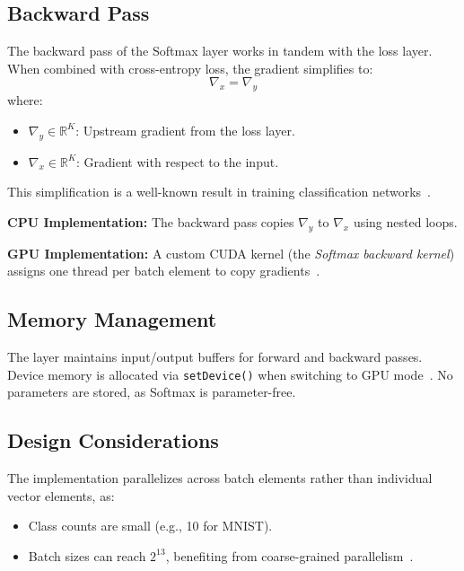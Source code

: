 \subsection{Backward Pass}

The backward pass of the Softmax layer works in tandem with the loss layer. When combined with cross-entropy loss, the gradient simplifies to:
\[
    \nabla_x = \nabla_y
\]
where:
\begin{itemize}
    \item \( \nabla_y \in \mathbb{R}^K \): Upstream gradient from the loss layer.
    \item \( \nabla_x \in \mathbb{R}^K \): Gradient with respect to the input.
\end{itemize}
This simplification is a well-known result in training classification networks~\cite{goodfellow2016deep}.

\textbf{CPU Implementation:}  
The backward pass copies \( \nabla_y \) to \( \nabla_x \) using nested loops.

\textbf{GPU Implementation:}  
A custom CUDA kernel (the \textit{Softmax backward kernel}) assigns one thread per batch element to copy gradients~\cite{nvidia_cudnn}.

\subsection{Memory Management}

The layer maintains input/output buffers for forward and backward passes. Device memory is allocated via \texttt{setDevice()} when switching to GPU mode~\cite{aws_gpu_performance}. No parameters are stored, as Softmax is parameter-free.

\subsection{Design Considerations}

The implementation parallelizes across batch elements rather than individual vector elements, as:
\begin{itemize}
    \item Class counts are small (e.g., 10 for MNIST).
    \item Batch sizes can reach \( 2^{13} \), benefiting from coarse-grained parallelism~\cite{neptune_gpu_optimization}.
\end{itemize}
